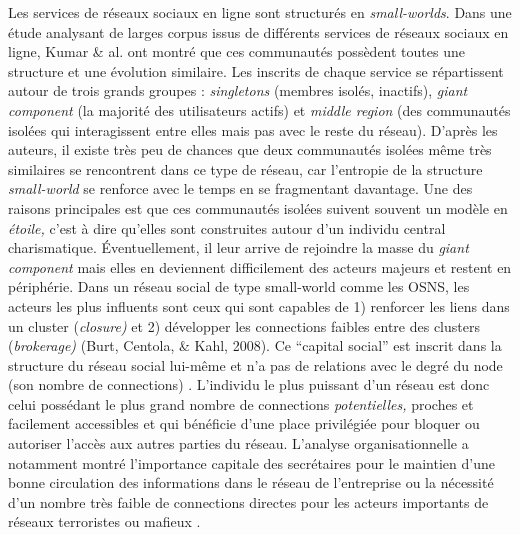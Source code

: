Les services de r\'eseaux sociaux en ligne sont structur\'es en
\textit{small-worlds}. Dans une \'etude analysant de larges corpus
issus de diff\'erents services de r\'eseaux sociaux en ligne, Kumar \&
al. \cite{Kumar2006} ont montr\'e que ces communaut\'es poss\`edent toutes une
structure et une \'evolution similaire. Les inscrits de chaque service
se r\'epartissent autour de trois grands groupes : \textit{singletons}
(membres isol\'es, inactifs), \textit{giant component} (la majorit\'e
des utilisateurs actifs) et \textit{middle region} (des communaut\'es
isol\'ees qui interagissent entre elles mais pas avec le reste du
r\'eseau). D{\textquoteright}apr\`es les auteurs, il existe tr\`es peu
de chances que deux communaut\'es isol\'ees m\^eme tr\`es similaires se
rencontrent dans ce type de r\'eseau, car l{\textquoteright}entropie de
la structure \textit{small-world }se renforce avec le temps en se
fragmentant davantage. Une des raisons principales est que ces
communaut\'es isol\'ees suivent souvent un mod\`ele en
\textit{\'etoile, }c{\textquoteright}est \`a dire
qu{\textquoteright}elles sont construites autour d{\textquoteright}un
individu central charismatique. \'Eventuellement, il leur arrive de
rejoindre la masse du \textit{giant component} mais elles en deviennent
difficilement des acteurs majeurs et restent en p\'eriph\'erie. Dans un
r\'eseau social de type small-world comme les OSNS, les acteurs les
plus influents sont ceux qui sont capables de 1) renforcer les liens
dans un cluster (\textit{closure)} et 2) d\'evelopper les connections
faibles entre des clusters (\textit{brokerage)} (Burt, Centola, \&
Kahl, 2008). Ce {\textquotedblleft}capital social{\textquotedblright}
est inscrit dans la structure du r\'eseau social lui-m\^eme \cite{Lin1999}
et n{\textquoteright}a pas de relations avec le degr\'e du node (son
nombre de connections) \cite{Cha2010}. L{\textquoteright}individu
le plus puissant d{\textquoteright}un r\'eseau est donc celui
poss\'edant le plus grand nombre de connections \textit{potentielles,
}proches et facilement accessibles et qui b\'en\'eficie
d{\textquoteright}une place privil\'egi\'ee pour bloquer ou autoriser
l{\textquoteright}acc\`es aux autres parties du r\'eseau.
L{\textquoteright}analyse organisationnelle a notamment montr\'e
l{\textquoteright}importance capitale des secr\'etaires pour le
maintien d{\textquoteright}une bonne circulation des informations dans
le r\'eseau de l{\textquoteright}entreprise ou la n\'ecessit\'e
d{\textquoteright}un nombre tr\`es faible de connections directes pour
les acteurs importants de r\'eseaux terroristes ou mafieux \cite{Russel2011}. 

